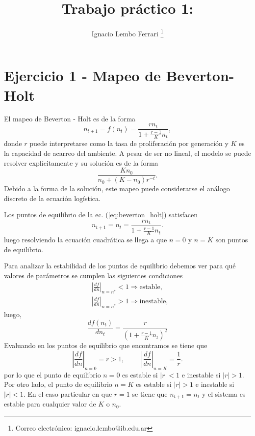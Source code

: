 \documentclass[letterpaper,12pt]{article}
\title{Trabajo práctico 1: } %
\author[1]{Ignacio Lembo Ferrari \thanks{Correo electrónico: ignacio.lembo@ib.edu.ar}}
\affil[1]{Instituto Balseiro}
\date{\vspace{-4ex}}
\theoremstyle{plain}
\begin{document}
\maketitle

\section{Ejercicio 1 - Mapeo de Beverton-Holt}

El mapeo de Beverton - Holt es de la forma 
\begin{equation}
    n_{t+1} = f(n_t) = \frac{r n_t}{1 + \frac{r-1}{K}n_t},
    \label{eq:beverton_holt}
\end{equation}
donde $r$ puede interpretarse como la tasa de proliferación por generación y $K$ es la capacidad de acarreo del ambiente. A pesar de ser no lineal, el modelo se puede resolver explícitamente y su solución es de la forma 
\begin{equation}
    \frac{K n_0}{n_0 + (K - n_0)r^{-t}}.
    \label{eq:beverton_sol}
\end{equation}
Debido a la forma de la solución, este mapeo puede considerarse el análogo discreto de la ecuación logística.

Los puntos de equilibrio de la ec. (\ref*{eq:beverton_holt}) satisfacen 
\begin{equation}
    n_{t+1} = n_t = \frac{r n_t}{1 + \frac{r-1}{K}n_t}.    
\end{equation}
luego resolviendo la ecuación cuadrática se llega a que $n=0$ y $n = K$ son puntos de equilibrio.

Para analizar la estabilidad de los puntos de equilibrio debemos ver para qué valores de parámetros se cumplen las siguientes condiciones 
\begin{align}
    &\left| \frac{df}{dn} \right|_{n=n^*} < 1 \Rightarrow \text{estable}, \\
    &\left| \frac{df}{dn} \right|_{n=n^*} > 1 \Rightarrow \text{inestable},
\end{align} 
luego,
\begin{equation}
    \frac{d f(n_t)}{d n_t} = \frac{r}{(1 + \frac{r-1}{K}n_t)^2} 
\end{equation}
Evaluando en los puntos de equilibrio que encontramos se tiene que 
\begin{equation}
    \left| \frac{df}{dn} \right|_{n=0} = r > 1, \hspace{1cm}
    \left| \frac{df}{dn} \right|_{n=K} = \frac{1}{r}.
\end{equation}
por lo que el punto de equilibrio $n=0$ es estable si $|r|<1$ e inestable si $|r|>1$. Por otro lado, el punto de equilibrio $n=K$ es estable si $|r|>1$ e inestable si $|r|<1$. En el caso particular en que $r=1$ se tiene que $n_{t+1} = n_t$ y el sistema es estable para cualquier valor de $K$ o $n_0$.
\end{document}
